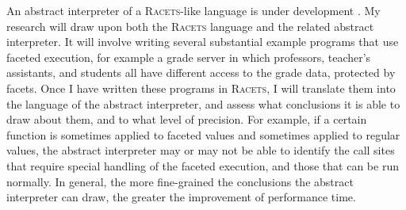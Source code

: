 \documentclass{article}
\begin{document}
An abstract interpreter of a \textsc{Racets}-like language is under development \cite{abstract-inter}. My research will draw upon both the \textsc{Racets} language and the related abstract interpreter. It will involve writing several substantial example programs that use faceted execution, for example a grade server in which professors, teacher's assistants, and students all have different access to the grade data, protected by facets. Once I have written these programs in \textsc{Racets}, I will translate them into the language of the abstract interpreter, and assess what conclusions it is able to draw about them, and to what level of precision. For example, if a certain function is sometimes applied to faceted values and sometimes applied to regular values, the abstract interpreter may or may not be able to identify the call sites that require special handling of the faceted execution, and those that can be run normally. In general, the more fine-grained the conclusions the abstract interpreter can draw, the greater the improvement of performance time.


\end{document}
